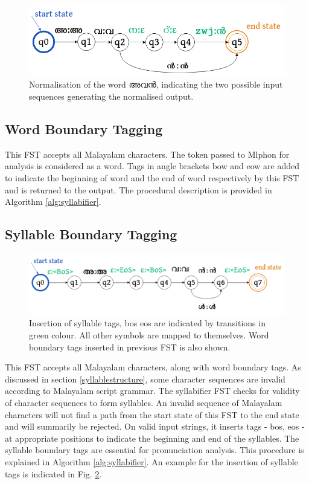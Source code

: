 \begin{figure}[htpb]
	\centering
	\includegraphics[width=0.8\linewidth]{egs_norm.png}
	\caption{Normalisation of the word {\mal അവൻ}, indicating the two possible input sequences generating the normalised output.}
	\label{fig:egnorm}
\end{figure}

\subsection{Word Boundary Tagging}

This FST accepts all Malayalam characters. The token passed to Mlphon for
analysis is considered as a word. Tags in angle brackets {\ipa \gls{bow}} and {\ipa
		\gls{eow}} are added to indicate the beginning of word and the end of word
respectively by this FST and is returned to the output. The procedural
description is provided in Algorithm \ref{alg:syllabifier}.

\subsection{Syllable Boundary Tagging}
\label{syllabletagger}

\begin{figure}[htpb]
	\centering
	\includegraphics[width=0.9\linewidth]{g2p-syltags.png}
	\caption{Insertion of syllable tags, {\ipa \gls{bos} \gls{eos}} are indicated by transitions in green colour. All other symbols are mapped to themselves. Word boundary tags inserted in previous FST is also shown. }
	\label{fig:g2p-syltags}
\end{figure}
This FST accepts all Malayalam characters, along with word boundary tags. As discussed in section  \ref{syllablestructure}, some character sequences are invalid according to Malayalam script grammar. The syllabifier FST checks for validity of character sequences to form syllables.  An invalid sequence of Malayalam characters will  not find a path from the start state of this FST to the end state and will summarily be rejected. On valid input strings, it inserts tags - {\ipa \gls{bos}}, {\ipa \gls{eos}} - at appropriate positions to indicate the beginning and end of the syllables. The syllable boundary tags are essential for pronunciation analysis. This procedure is explained in Algorithm \ref{alg:syllabifier}. An example for the insertion of syllable tags is indicated in Fig. \ref{fig:g2p-syltags}.

